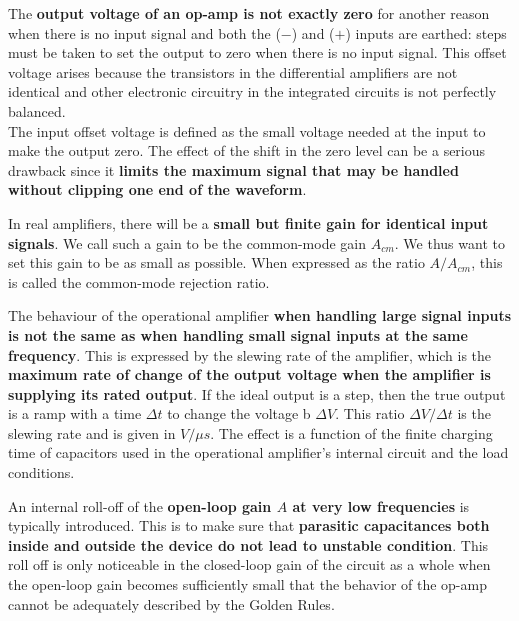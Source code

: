 \documentclass[a4paper]{article}
\begin{document}
\begin{Note}
The \textbf{output voltage of an op-amp is not exactly zero} for another reason when there is no input signal and both the ($-$) and ($+$) inputs are earthed: steps must be taken to set the output to zero when there is no input signal. This offset voltage arises because the transistors in the differential amplifiers are not identical and other electronic circuitry in the integrated circuits is not perfectly balanced.\\[5pt]
The input offset voltage is defined as the small voltage needed at the input to make the output zero. The effect of the shift in the zero level can be a serious drawback since it \textbf{limits the maximum signal that may be handled without clipping one end of the waveform}.
\end{Note}
\begin{Note}
In real amplifiers, there will be a \textbf{small but finite gain for identical input signals}. We call such a gain to be the common-mode gain $A_{cm}$. We thus want to set this gain to be as small as possible. When expressed as the ratio $A/A_{cm}$, this is called the common-mode rejection ratio.
\end{Note}
\begin{Note}
The behaviour of the operational amplifier\textbf{ when handling large signal inputs is not the same as when handling small signal inputs at the same frequency}. This is expressed by the slewing rate of the amplifier, which is the \textbf{maximum rate of change of the output voltage when the amplifier is supplying its rated output}. If the ideal output is a step, then the true output is a ramp with a  time $\Delta t$ to change the voltage b $\Delta V$. This ratio $\Delta V/\Delta t$ is the slewing rate and is given in $V/\mu s$. The effect is a function of the finite charging time of capacitors used in the operational amplifier's internal circuit and the load conditions.
\end{Note}
\newpage
\begin{Note}
An internal roll-off of the \textbf{open-loop gain $A$ at very low frequencies} is typically introduced. This is to make sure that \textbf{parasitic capacitances both inside and outside the device do not lead to unstable condition}. This roll off is only noticeable in the closed-loop gain of the circuit as a whole when the open-loop gain becomes sufficiently small that the behavior of the op-amp cannot be adequately described by the Golden Rules.
\end{Note}
\end{document}
